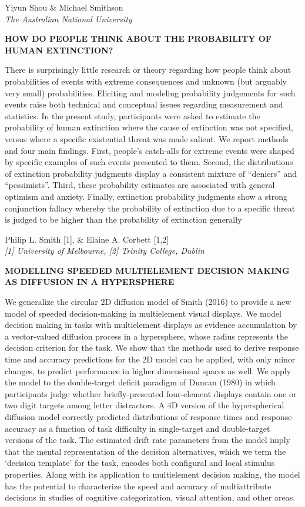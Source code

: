 \documentclass[]{article}
\begin{document}
Yiyun Shou \& Michael Smithson\\
\emph{The Australian National University }

\textbf{HOW DO PEOPLE THINK ABOUT THE PROBABILITY OF HUMAN EXTINCTION?}

There is surprisingly little research or theory regarding how people
think about probabilities of events with extreme consequences and
unknown (but arguably very small) probabilities. Eliciting and modeling
probability judgements for such events raise both technical and
conceptual issues regarding measurement and statistics. In the present
study, participants were asked to estimate the probability of human
extinction where the cause of extinction was not specified, versus where
a specific existential threat was made salient. We report methods and
four main findings. First, people's catch-alls for extreme events were
shaped by specific examples of such events presented to them. Second,
the distributions of extinction probability judgments display a
consistent mixture of ``deniers'' and ``pessimists''. Third, these
probability estimates are associated with general optimism and anxiety.
Finally, extinction probability judgments show a strong conjunction
fallacy whereby the probability of extinction due to a specific threat
is judged to be higher than the probability of extinction generally\\
\pagebreak  

Philip L. Smith {[}1{]}, \& Elaine A. Corbett {[}1,2{]}\\
\emph{{[}1{]} University of Melbourne, {[}2{]} Trinity College, Dublin}

\textbf{MODELLING SPEEDED MULTIELEMENT DECISION MAKING AS DIFFUSION IN A
HYPERSPHERE}

We generalize the circular 2D diffusion model of Smith (2016) to provide
a new model of speeded decision-making in multielement visual displays.
We model decision making in tasks with multielement displays as evidence
accumulation by a vector-valued diffusion process in a hypersphere,
whose radius represents the decision criterion for the task. We show
that the methods used to derive response time and accuracy predictions
for the 2D model can be applied, with only minor changes, to predict
performance in higher dimensional spaces as well. We apply the model to
the double-target deficit paradigm of Duncan (1980) in which
participants judge whether briefly-presented four-element displays
contain one or two digit targets among letter distractors. A 4D version
of the hyperspherical diffusion model correctly predicted distributions
of response times and response accuracy as a function of task difficulty
in single-target and double-target versions of the task. The estimated
drift rate parameters from the model imply that the mental
representation of the decision alternatives, which we term the `decision
template' for the task, encodes both configural and local stimulus
properties. Along with its application to multielement decision making,
the model has the potential to characterize the speed and accuracy of
multiattribute decisions in studies of cognitive categorization, visual
attention, and other areas.\\
\pagebreak  
\end{document}
